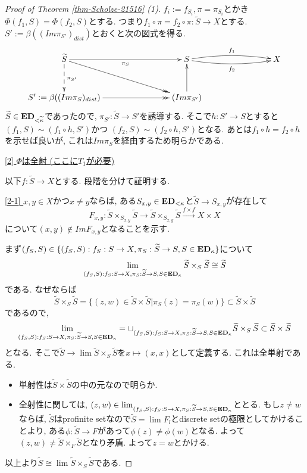 \documentclass[dvipdfmx,a4paper,11pt]{report}
\theoremstyle{definition}
\begin{document}
\begin{proof}[Proof of Theorem \ref{thm-Scholze-21516} (1)]
$f_i := f_{S_i}, \pi = \pi_{S_i}$とかき
$\Phi(f_1, S) = \Phi(f_2, S)$とする.
つまり$f_1 \circ \pi = f_2 \circ \pi : \widetilde{S} \to X$とする. 
$S' := \beta((Im \pi_{S'})_{dist})$とおくと次の図式を得る. 
\begin{equation*}
\xymatrix@C=80pt@R=30pt{
\widetilde{S}
\ar@{-->}[d]^{\pi_{S'}}
\ar@{->>}[rd]
\ar@{->}[r]_{\pi_{S}}
&S
 \ar@/^5pt/[r]^{f_1}
  \ar@/_5pt/[r]_{f_2}
&X
\\
S' := \beta((Im \pi_{S})_{dist}) \ar@{->>}[r]
&(Im \pi_{S'})\ar@{->}[u]
&
 \\   
}
\end{equation*}
$\widetilde{S} \in {\bf ED}_{< \widetilde{\kappa}}$であったので, 
$\pi_{S'} : \widetilde{S} \to S'$を誘導する.
そこで$h : S' \to S$とすると
$(f_1, S) \sim  (f_1 \circ h,S')$かつ
$(f_2, S) \sim  (f_2 \circ h,S')$となる.
あとは$f_1 \circ h = f_2 \circ h$を示せば良いが, これは$Im \pi_{S}$を経由するため明らかである. 

\underline{[2] $\Phi$は全射 (ここに$T_1$が必要) }

以下$f : \widetilde{S} \to X$とする. 
段階を分けて証明する. 

\underline{[2-1] } $x,y \in X$かつ$x \neq y$ならば, ある$S_{x, y} \in {\bf ED}_{<\kappa}$と$ \widetilde{S} \to S_{x,y}$が存在して
$$
F_{x,y} : \widetilde{S} \times_{S_{x,y}}\widetilde{S} 
\longrightarrow
\widetilde{S} \times_{S_{x,y}}\widetilde{S} 
\overset{f \times f}{\longrightarrow}
X \times X
$$
について$(x,y)\not \in Im F_{x,y}$となることを示す. 

まず$(f_S, S) \in \{(f_S, S) : f_S : S \to X, \pi_{S}: \widetilde{S} \to S, S \in {\bf ED}_{\kappa} \}$について
$$
\lim_{(f_S, S) : f_S : S \to X, \pi_{S}: \widetilde{S} \to S, S \in {\bf ED}_{\kappa} }
 \widetilde{S} \times_{S} \widetilde{S}
 \cong 
 \widetilde{S} 
$$
である. なぜならば
$$ \widetilde{S} \times_{S} \widetilde{S}
=
\{ (z,w) \in \widetilde{S} \times \widetilde{S} | \pi_{S}(z) = \pi_{S}(w)\} \subset \widetilde{S} \times \widetilde{S}
$$
であるので, 
$$
\lim_{(f_S, S) : f_S : S \to X, \pi_{S}: \widetilde{S} \to S, S \in {\bf ED}_{\kappa} }
= \cup_{(f_S, S) : f_S : S \to X, \pi_{S}: \widetilde{S} \to S, S \in {\bf ED}_{\kappa} } \widetilde{S} \times_{S} \widetilde{S}
\subset \widetilde{S} \times \widetilde{S}
$$
となる. そこで$\widetilde{S} \to  \lim \widetilde{S} \times_{S} \widetilde{S}$を$x \mapsto (x,x)$として定義する. これは全単射である.
\begin{itemize}
\item 単射性は$\widetilde{S} \times \widetilde{S}$の中の元なので明らか.
 \item 全射性に関しては, $( z, w )\in \lim_{(f_S, S) : f_S : S \to X, \pi_{S}: \widetilde{S} \to S, S \in {\bf ED}_{\kappa} }$ととる. 
もし$z \neq w$ならば, $\widetilde{S}$はprofinite setなので$\widetilde{S} = \lim F_l$とdiscrete setの極限としてかけることより, ある$\phi : \widetilde{S} \to F$があって$\phi(z) \neq \phi(w)$となる. 
よって$(z, w) \neq \widetilde{S} \times_{F} \widetilde{S}$となり矛盾. よって$z=w$とかける. 
\end{itemize}
以上より$\widetilde{S} \cong \lim \widetilde{S} \times_{S} \widetilde{S}$である.


\end{proof}
\end{document}
